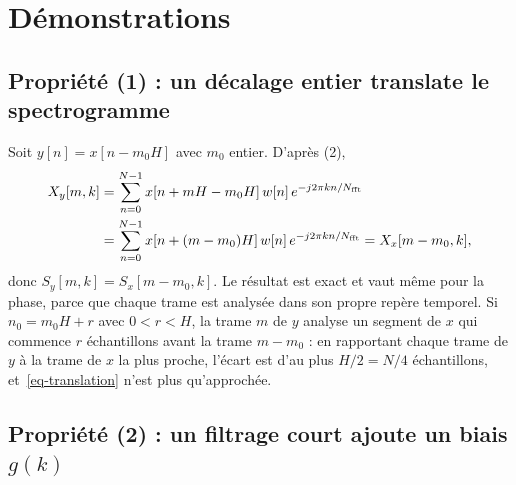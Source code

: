 \section{Démonstrations}
\label{sec-demos}

\subsection{Propriété (1) : un décalage entier translate le spectrogramme}
\label{sec-demo-translation}

Soit $y[n] = x[n - m_0H]$ avec $m_0$ entier. D'après (2),
\begin{equation}
\begin{split}
  X_y[m,k]
  &= \sum_{n=0}^{N-1} x[n + mH - m_0H]\, w[n]\, e^{-j2\pi kn/N_{\mathrm{fft}}} \\
  &= \sum_{n=0}^{N-1} x[n + (m-m_0)H]\, w[n]\, e^{-j2\pi kn/N_{\mathrm{fft}}}
  = X_x[m-m_0, k],
\end{split}
  \label{eq-translation}
\end{equation}
donc $S_y[m,k] = S_x[m-m_0,k]$. Le résultat est exact et vaut même pour la phase, parce que
chaque trame est analysée dans son propre repère temporel. Si $n_0 = m_0H + r$ avec
$0 < r < H$, la trame $m$ de $y$ analyse un segment de $x$ qui commence $r$ échantillons
avant la trame $m-m_0$ : en rapportant chaque trame de $y$ à la trame de $x$ la plus proche,
l'écart est d'au plus $H/2 = N/4$ échantillons, et~\eqref{eq-translation} n'est plus
qu'approchée.

\subsection{Propriété (2) : un filtrage court ajoute un biais \texorpdfstring{$g(k)$}{g(k)}}
\label{sec-demo-filtrage}

